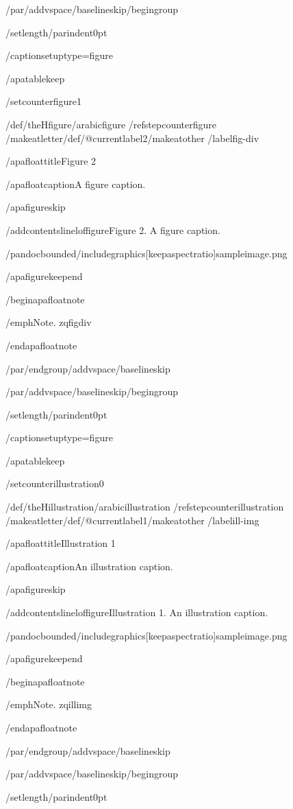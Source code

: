 /par/addvspace{/baselineskip}/begingroup

/setlength{/parindent}{0pt}

/captionsetup{type=figure}

/apatablekeep

/setcounter{figure}{1}

/def/theHfigure{/arabic{figure}}%
/refstepcounter{figure}%
/makeatletter/def/@currentlabel{2}/makeatother%
/label{fig-div}

/apafloattitle{Figure 2}

/apafloatcaption{A figure caption.}

/apafigureskip

/addcontentsline{lof}{figure}{Figure 2. A figure caption.}

/pandocbounded{/includegraphics[keepaspectratio]{sampleimage.png}}

/apafigurekeepend

/begin{apafloatnote}

/emph{Note}. zqfigdiv

/end{apafloatnote}

/par/endgroup/addvspace{/baselineskip}

/par/addvspace{/baselineskip}/begingroup

/setlength{/parindent}{0pt}

/captionsetup{type=figure}

/apatablekeep

/setcounter{illustration}{0}

/def/theHillustration{/arabic{illustration}}%
/refstepcounter{illustration}%
/makeatletter/def/@currentlabel{1}/makeatother%
/label{ill-img}

/apafloattitle{Illustration 1}

/apafloatcaption{An illustration caption.}

/apafigureskip

/addcontentsline{lof}{figure}{Illustration 1. An illustration caption.}

/pandocbounded{/includegraphics[keepaspectratio]{sampleimage.png}}

/apafigurekeepend

/begin{apafloatnote}

/emph{Note}. zqillimg

/end{apafloatnote}

/par/endgroup/addvspace{/baselineskip}

/par/addvspace{/baselineskip}/begingroup

/setlength{/parindent}{0pt}

